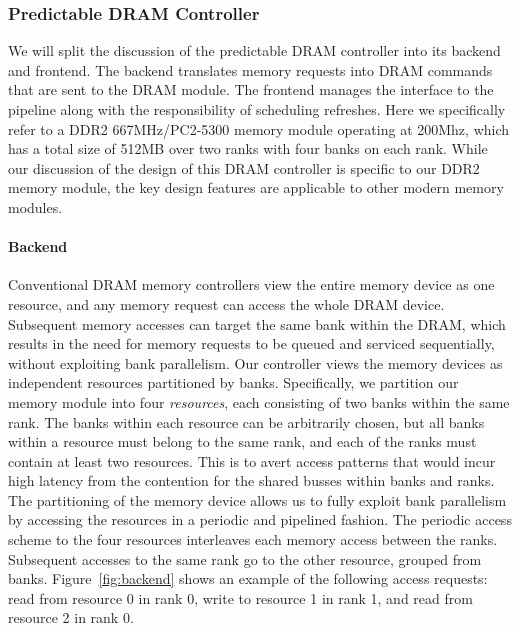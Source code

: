 \subsubsection{Predictable DRAM Controller}
\label{sec:pret_dram_controller}
We will split the discussion of the predictable DRAM controller into its backend and frontend. 
The backend translates memory requests into DRAM commands that are sent to the DRAM module.
The frontend manages the interface to the pipeline along with the responsibility of scheduling refreshes.
Here we specifically refer to a DDR2 667MHz/PC2-5300 memory module operating at 200Mhz, which has a total size of 512MB over two ranks with four banks on each rank.
While our discussion of the design of this DRAM controller is specific to our DDR2 memory module, the key design features are applicable to other modern memory modules.

\paragraph{Backend}
Conventional DRAM memory controllers view the entire memory device as one resource, and any memory request can access the whole DRAM device. 
Subsequent memory accesses can target the same bank within the DRAM, which results in the need for memory requests to be queued and serviced sequentially, without exploiting bank parallelism.
Our controller views the memory devices as independent resources partitioned by banks. 
Specifically, we partition our memory module into four \emph{resources}, each consisting of two banks within the same rank. 
The banks within each resource can be arbitrarily chosen, but all banks within a resource must belong to the same rank, and each of the ranks must contain at least two resources.
This is to avert access patterns that would incur high latency from the contention for the shared busses within banks and ranks.
The partitioning of the memory device allows us to fully exploit bank parallelism by accessing the resources in a periodic and pipelined fashion.
The periodic access scheme to the four resources interleaves each memory access between the ranks.
Subsequent accesses to the same rank go to the other resource, grouped from banks.  
Figure~\ref{fig:backend} shows an example of the following access requests: read from resource 0 in rank 0, write to resource 1 in rank 1, and read from resource 2 in rank 0. 

